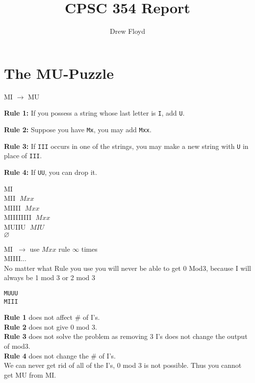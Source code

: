 \documentclass{article}
\title{CPSC 354 Report}
\author{Drew Floyd} %
\date{}
\begin{document}
\maketitle
\tableofcontents
\newpage

\section{The MU-Puzzle}

MI $\rightarrow$ MU

\textbf{Rule 1:} If you possess a string whose last letter is \texttt{I}, add \texttt{U}.

\textbf{Rule 2:} Suppose you have \texttt{Mx}, you may add \texttt{Mxx}.

\textbf{Rule 3:} If \texttt{III} occurs in one of the strings, you may make a new string with \texttt{U} in place of \texttt{III}.

\textbf{Rule 4:} If \texttt{UU}, you can drop it.

\vspace{1em}

MI \\
MII $\; Mxx$ \\
MIIII $\; Mxx$ \\
MIIIIIIII $\; Mxx$ \\
MUIIU $\; MIU$ \\
$\varnothing$

\vspace{1em}

MI $\; \rightarrow$ use $Mxx$ rule $\infty$ times \\
MIIII... \\

No matter what Rule you use you will never be able to get 0 Mod3, because I will always be 1 mod 3 or 2 mod 3

\vspace{1em}

\texttt{MUUU} \\
\texttt{MIII}

\vspace{1em}

\textbf{Rule 1} does not affect \# of I's. \\
\textbf{Rule 2} does not give 0 mod 3. \\
\textbf{Rule 3} does not solve the problem as removing 3 I's does not change the output of mod3. \\
\textbf{Rule 4} does not change the \# of I's. \\

We can never get rid of all of the I's, 0 mod 3 is not possible. Thus you cannot get MU from MI.
\end{document}
